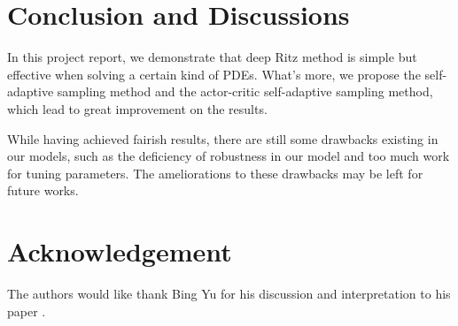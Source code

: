 \documentclass{article}
\begin{document}
\section{Conclusion and Discussions}
\par In this project report, we demonstrate that deep Ritz method is simple but effective when solving a certain kind of PDEs. What's more, we propose the self-adaptive sampling method and the actor-critic self-adaptive sampling method, which lead to great improvement on the results.
\par While having achieved fairish results, there are still some drawbacks existing in our models, such as the deficiency of robustness in our model and too much work for tuning parameters. The ameliorations to these drawbacks may be left for future works.

\section*{Acknowledgement}
\par The authors would like thank Bing Yu for his discussion and interpretation to his paper \cite{yu2017deep}.





\medskip

\small
\end{document}
